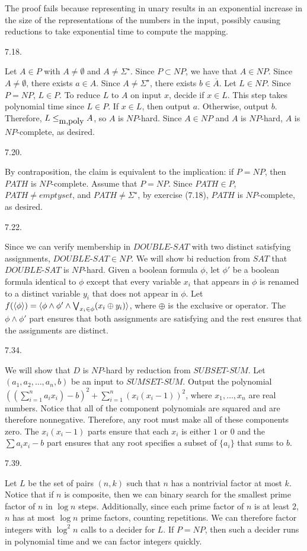 The proof fails because representing in unary results in an exponential
increase in the size of the representations of the numbers in the input,
possibly causing reductions to take exponential time to compute the mapping.

\bigskip
\item{7.18.}

Let $A \in P$ with $A \ne \emptyset$ and $A \ne \Sigma ^\star$.
Since $P \subset NP$, we have that $A \in NP$.
Since $A \ne \emptyset$, there exists $a \in A$.
Since $A \ne \Sigma ^\star$, there exists $b \in \overline A$.
Let $L \in NP$.
Since $P = NP$, $L \in P$.
To reduce $L$ to $A$ on input $x$, decide if $x \in L$.
This step takes polynomial time since $L \in P$.
If $x \in L$, then output $a$.
Otherwise, output $b$.
Therefore, $L \le _{\hbox{m,poly}} A$, so $A$ is $NP$-hard.
Since $A \in NP$ and $A$ is $NP$-hard, $A$ is $NP$-complete, as desired.
\bigskip
\item{7.20.}

By contraposition, the claim is equivalent to the implication:
if $P = NP$, then $PATH$ is $NP$-complete.
Assume that $P = NP$.
Since $PATH \in P$, $PATH \ne emptyset$, and $PATH \ne \Sigma ^\star$,
by exercise (7.18), $PATH$ is $NP$-complete, as desired.
\bigskip
\item{7.22.}

Since we can verify membership in $DOUBLE$-$SAT$ with two distinct
satisfying assignments, $DOUBLE$-$SAT \in NP$.
We will show bi reduction from $SAT$ that $DOUBLE$-$SAT$ is $NP$-hard.
Given a boolean formula $\phi$,
let $\phi'$ be a boolean formula identical to $\phi$
except that every variable $x_i$ that appears in $\phi$
is renamed to a distinct variable $y_i$ that does not appear in $\phi$.
Let $f(\langle\phi\rangle) = \langle\phi \wedge \phi' \wedge
\bigvee _{x_i \in \phi} (x_i \oplus y_i)\rangle$,
where $\oplus$ is the exclusive or operator.
The $\phi \wedge \phi'$ part ensures that both assignments are satisfying
and the rest ensures that the assignments are distinct.
\bigskip
\item{7.34.}

We will show that $D$ is $NP$-hard by reduction from $SUBSET$-$SUM$.
Let $(a_1,a_2,\ldots,a_n,b)$ be an input to $SUMSET$-$SUM$.
Output the polynomial
$((\sum _{i=1} ^n a_i x_i) - b)^2 + \sum _{i=1} ^n (x_i (x_i - 1))^2$,
where $x_1, \ldots, x_n$ are real numbers.
Notice that all of the component polynomials are squared and are therefore nonnegative.
Therefore, any root must make all of these components zero.
The $x_i(x_i - 1)$ parts ensure that each $x_i$ is either $1$ or $0$
and the $\sum a_i x_i - b$ part ensures that any root specifies a subset
of $\{a_i\}$ that sums to $b$.
\bigskip
\item{7.39.}

Let $L$ be the set of pairs $(n,k)$ such that
$n$ has a nontrivial factor at most $k$.
Notice that if $n$ is composite,
then we can binary search for the smallest prime factor of $n$
in $\log n$ steps.
Additionally, since each prime factor of $n$ is at least $2$,
$n$ has at most $\log n$ prime factors, counting repetitions.
We can therefore factor integers with $\log ^2 n$ calls
to a decider for $L$.
If $P = NP$, then such a decider runs in polynomial time
and we can factor integers quickly.
\bye
